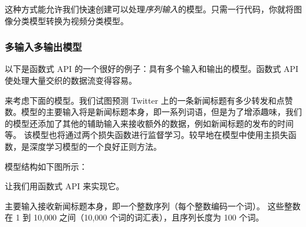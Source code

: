 这种方式能允许我们快速创建可以处理\emph{序列输入}的模型。只需一行代码，你就将图像分类模型转换为视频分类模型。

\begin{Shaded}
\begin{Highlighting}[]
  

\OperatorTok{=} \OperatorTok{=}\NormalTok{(}\NormalTok{, }\NormalTok{))}

\OperatorTok{=} 
\end{Highlighting}
\end{Shaded}


\subsubsection{多输入多输出模型}\label{ux591aux8f93ux5165ux591aux8f93ux51faux6a21ux578b}

以下是函数式 API 的一个很好的例子：具有多个输入和输出的模型。函数式 API
使处理大量交织的数据流变得容易。

来考虑下面的模型。我们试图预测 Twitter
上的一条新闻标题有多少转发和点赞数。模型的主要输入将是新闻标题本身，即一系列词语，但是为了增添趣味，我们的模型还添加了其他的辅助输入来接收额外的数据，例如新闻标题的发布的时间等。
该模型也将通过两个损失函数进行监督学习。较早地在模型中使用主损失函数，是深度学习模型的一个良好正则方法。

模型结构如下图所示：

让我们用函数式 API 来实现它。

主要输入接收新闻标题本身，即一个整数序列（每个整数编码一个词）。
这些整数在 1 到 10,000 之间（10,000 个词的词汇表），且序列长度为 100
个词。

